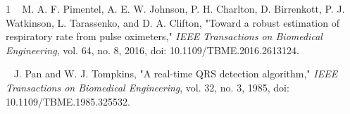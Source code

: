 \documentclass{citask}
\begin{document}
\begin{thebibliography}{1}
M. A. F. Pimentel, A. E. W. Johnson, P. H. Charlton, D. Birrenkott, P. J. Watkinson, L. Tarassenko, and D. A. Clifton, "Toward a robust estimation of respiratory rate from pulse oximeters," \emph{IEEE Transactions on Biomedical Engineering}, vol. 64, no. 8, 2016, doi: 10.1109/TBME.2016.2613124.

J. Pan and W. J. Tompkins, "A real-time QRS detection algorithm," \emph{IEEE Transactions on Biomedical Engineering}, vol. 32, no. 3, 1985, doi: 10.1109/TBME.1985.325532.
\end{thebibliography}
\end{document}
